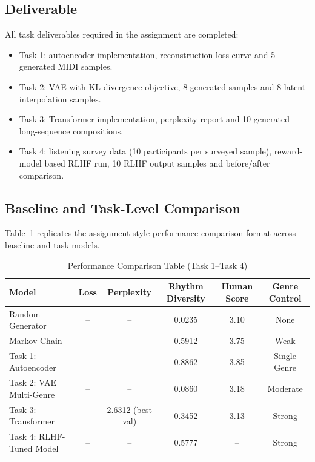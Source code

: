 \documentclass[conference]{IEEEtran}
\begin{document}
\subsection{Deliverable}
All task deliverables required in the assignment are completed:
\begin{itemize}
\item Task 1: autoencoder implementation, reconstruction loss curve and 5 generated MIDI samples.
\item Task 2: VAE with KL-divergence objective, 8 generated samples and 8 latent interpolation samples.
\item Task 3: Transformer implementation, perplexity report and 10 generated long-sequence compositions.
\item Task 4: listening survey data (10 participants per surveyed sample), reward-model based RLHF run, 10 RLHF output samples and before/after comparison.
\end{itemize}

\subsection{Baseline and Task-Level Comparison}
Table~\ref{tab:baseline-task-comparison} replicates the assignment-style performance comparison format across baseline and task models.

\begin{table}[!t]
\caption{Performance Comparison Table (Task 1--Task 4)}
\label{tab:baseline-task-comparison}
\begin{center}
\begin{tabular}{lccccc}
\toprule
Model & Loss & Perplexity & Rhythm Diversity & Human Score & Genre Control \\
\midrule
Random Generator & -- & -- & 0.0235 & 3.10 & None \\
Markov Chain & -- & -- & 0.5912 & 3.75 & Weak \\
Task 1: Autoencoder & -- & -- & 0.8862 & 3.85 & Single Genre \\
Task 2: VAE Multi-Genre & -- & -- & 0.0860 & 3.18 & Moderate \\
Task 3: Transformer & -- & 2.6312 (best val) & 0.3452 & 3.13 & Strong \\
Task 4: RLHF-Tuned Model & -- & -- & 0.5777 & -- & Strong \\
\bottomrule
\end{tabular}
\end{center}
\end{table}
\end{document}

